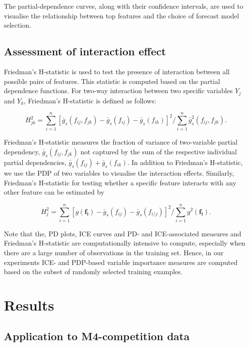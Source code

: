 \documentclass[11pt,a4paper,]{article}
\begin{document}
The partial-dependence curves, along with their confidence intervals, are used to visualise the relationship between top features and the choice of forecast model selection.

\hypertarget{assessment-of-interaction-effect}{%
\subsection{Assessment of interaction effect}\label{assessment-of-interaction-effect}}

Friedman's H-statistic \autocite{friedman2008predictive} is used to test the presence of interaction between all possible pairs of features. This statistic is computed based on the partial dependence functions. For two-way interaction between two specific variables \(Y_j\) and \(Y_k\), Friedman's H-statistic is defined as follows:

\[H_{jk}^2=\sum_{i=1}^{n}[\bar{g}_{s}(f_{ij}, f_{jk})-\bar{g}_{s}(f_{ij})-\bar{g}_{s}(f_{ik})]^2/\sum_{i=1}^{n}\bar{g}^2_{s}(f_{ij}, f_{jk}).\]

Friedman's H-statistic measures the fraction of variance of two-variable partial dependency, \(\bar{g}_{s}(f_{ij}, f_{jk})\) not captured by the sum of the respective individual partial dependencies, \(\bar{g}_{s}(f_{ij})+\bar{g}_{s}(f_{ik})\). In addition to Friedman's H-statistic, we use the PDP of two variables to visualise the interaction effects. Similarly, Friedman's H-statistic for testing whether a specific feature interacts with any other feature can be estimated by

\[H_{j}^2=\sum_{i=1}^{n}[{g}(\bm{f_{i}})-\bar{g}_{s}(f_{ij})-\bar{g}_{s}(f_{i/j})]^2/\sum_{i=1}^{n}g^2(\bm{f_{i}}).\]

Note that the, PD plots, ICE curves and PD- and ICE-associated measures and Friedman's H-statistic are computationally intensive to compute, especially when there are a large number of observations in the training set. Hence, in our experiments ICE- and PDP-based variable importance measures are computed based on the subset of randomly selected training examples.

\hypertarget{results}{%
\section{Results}\label{results}}

\hypertarget{application-to-m4-competition-data}{%
\subsection{Application to M4-competition data}\label{application-to-m4-competition-data}}
\end{document}
